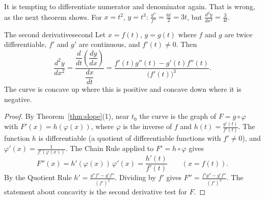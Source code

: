 \documentclass[11pt]{article}
\begin{document}
\begin{center}
\end{center}

\begin{warn}
It is tempting to differentiate numerator and denominator again. That is wrong, as the next theorem shows. For $x=t^2$, $y=t^3$: $\frac{g''}{f''}=\frac{6t}2=3t$, but $\frac{d^2y}{dx^2}=\frac3{4t}$.
\end{warn}

\begin{thm}{The second derivative}{second}
Let $x=f(t)$, $y=g(t)$ where $f$ and $g$ are twice differentiable, $f'$ and $g'$ are continuous, and $f'(t)\ne0$. Then
\[
\frac{d^2y}{dx^2}=\frac{\dfrac{d}{dt}\left(\dfrac{dy}{dx}\right)}{\dfrac{dx}{dt}}=\frac{f'(t)g''(t)-g'(t)f''(t)}{\bigl(f'(t)\bigr)^3}.
\]
The curve is concave up where this is positive and concave down where it is negative.
\end{thm}
\begin{proof}
By Theorem~\ref{thm:slope}(1), near $t_0$ the curve is the graph of $F=g\circ\varphi$ with $F'(x)=h(\varphi(x))$, where $\varphi$ is the inverse of $f$ and $h(t)=\frac{g'(t)}{f'(t)}$. The function $h$ is differentiable (a quotient of differentiable functions with $f'\ne0$), and $\varphi'(x)=\frac1{f'(\varphi(x))}$. The Chain Rule applied to $F'=h\circ\varphi$ gives
\[
F''(x)=h'(\varphi(x))\,\varphi'(x)=\frac{h'(t)}{f'(t)}\qquad(x=f(t)).
\]
By the Quotient Rule $h'=\frac{g''f'-g'f''}{(f')^2}$. Dividing by $f'$ gives $F''=\frac{f'g''-g'f''}{(f')^3}$. The statement about concavity is the second derivative test for $F$.
\end{proof}
\end{document}
